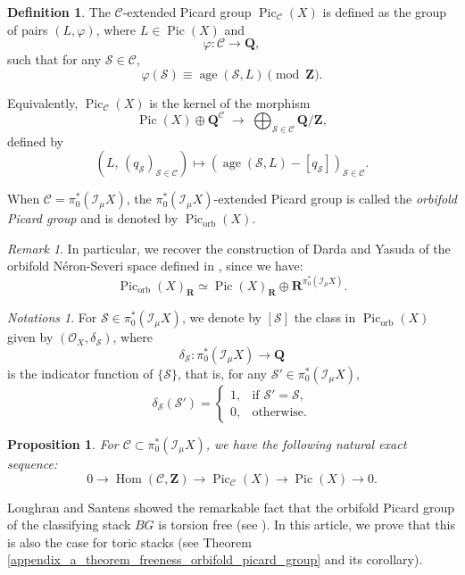 \documentclass{proc-l}
\newcommand{\R}{\mathbf{R}}
\newcommand{\Z}{\mathbf{Z}}
\newcommand{\Q}{\mathbf{Q}}
\DeclareMathOperator{\Pic}{Pic}
\DeclareMathOperator{\Hom}{Hom}
\DeclareMathOperator{\age}{age}
\DeclareMathOperator{\orb}{orb}
\newcommand{\stackS}{\mathcal{S}}
\newcommand{\sheafI}{\mathcal{I}}
\newcommand{\sheafO}{\mathcal{O}}
\newcommand{\twistsector}{\pi_0^*(\sheafI_{\mu} X)}
\newtheorem{prop}[theorem]{Proposition}
\theoremstyle{definition}
\newtheorem{definition}[theorem]{Definition}
\theoremstyle{remark}
\newtheorem{remark}[theorem]{Remark}
\newtheorem{Notations}[theorem]{Notations}
\numberwithin{equation}{section}
\begin{document}
\begin{definition}\label{definition_orbifold_picard_group}
The $\mathcal{C}$-extended Picard group $\Pic_{\mathcal{C}}(X)$ is defined as the group
of pairs $(L,\varphi)$, where $L \in \Pic(X)$ and
\[
\varphi : \mathcal{C} \longrightarrow \Q,
\]
such that for any $\stackS \in \mathcal{C}$,
\[
\varphi(\stackS) \equiv \age(\stackS,L) \pmod{\Z}.
\]

Equivalently, $\Pic_{\mathcal{C}}(X)$ is the kernel of the morphism
\[
\Pic(X)
\oplus
\Q^{\mathcal{C}}
\;\longrightarrow\;
\bigoplus_{\stackS \in \mathcal{C}} \Q / \Z,
\]
defined by
\[
\left( L,\,(q_{\stackS})_{\stackS \in \mathcal{C}} \right)
\longmapsto
\left( \age(\stackS,L) - [q_{\stackS}] \right)_{\stackS \in \mathcal{C}}.
\]

When $\mathcal{C} = \twistsector$, the $\twistsector$-extended Picard group is called
the \emph{orbifold Picard group} and is denoted by $\Pic_{\orb}(X)$.
\end{definition}


\begin{remark}
    In particular, we recover the construction of Darda and Yasuda of the orbifold Néron-Severi space defined in \cite[definition 8.1]{darda2024batyrevmanin}, since we have:
    $$\Pic_{\orb}(X)_{\R} \simeq \Pic(X)_{\R} \oplus \R^{\twistsector} .$$
\end{remark}

\begin{Notations}\label{notation_orbi_line_bundle_associated_to_a_sector}
For $\stackS \in \twistsector$, we denote by $[\stackS]$ the class in
$\Pic_{\orb}(X)$ given by $(\sheafO_X,\delta_{\stackS})$, where
\[
\delta_{\stackS} : \twistsector \longrightarrow \Q
\]
is the indicator function of $\{\stackS\}$, that is, for any
$\stackS' \in \twistsector$,
\[
\delta_{\stackS}(\stackS') =
\begin{cases}
1, & \text{if } \stackS' = \stackS,\\
0, & \text{otherwise}.
\end{cases}
\]
\end{Notations}


\begin{prop}\label{prop_exact_sequence_extended_picard_group}
    For $\mathcal{C} \subset \twistsector$, we have the following natural exact sequence:
    $$0 \rightarrow \Hom(\mathcal{C},\Z) \rightarrow \Pic_{\mathcal{C}}(X) \rightarrow \Pic(X) \rightarrow 0 .$$
\end{prop}

Loughran and Santens showed the remarkable fact that the orbifold Picard group of the classifying stack $B G$ is torsion free (see \cite[lemma 3.13]{loughran_santens_malle_conjecture}). In this article, we prove that this is also the case for toric stacks (see Theorem \ref{appendix_a_theorem_freeness_orbifold_picard_group} and its corollary).
\end{document}
